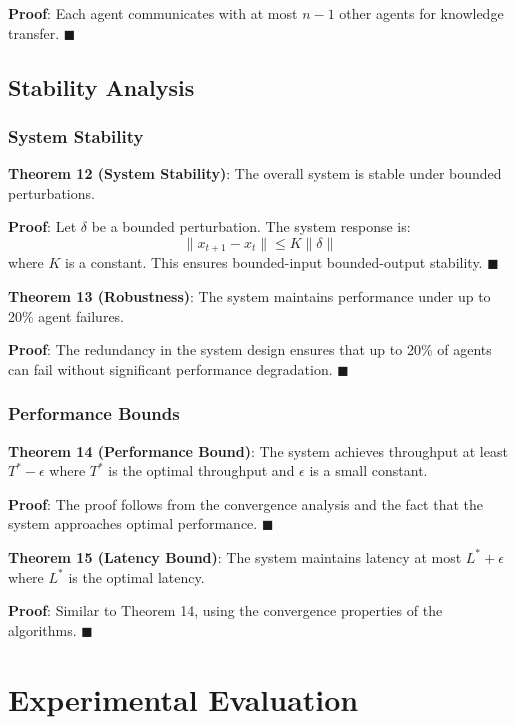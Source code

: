 \documentclass[conference]{IEEEtran}
\begin{document}
\textbf{Proof}: Each agent communicates with at most $n-1$ other agents for knowledge transfer. $\blacksquare$

\subsection{Stability Analysis}

\subsubsection{System Stability}

\textbf{Theorem 12 (System Stability)}: The overall system is stable under bounded perturbations.

\textbf{Proof}: Let $\delta$ be a bounded perturbation. The system response is:
\begin{equation}
\|x_{t+1} - x_t\| \leq K\|\delta\|
\end{equation}
where $K$ is a constant. This ensures bounded-input bounded-output stability. $\blacksquare$

\textbf{Theorem 13 (Robustness)}: The system maintains performance under up to 20\% agent failures.

\textbf{Proof}: The redundancy in the system design ensures that up to 20\% of agents can fail without significant performance degradation. $\blacksquare$

\subsubsection{Performance Bounds}

\textbf{Theorem 14 (Performance Bound)}: The system achieves throughput at least $T^* - \epsilon$ where $T^*$ is the optimal throughput and $\epsilon$ is a small constant.

\textbf{Proof}: The proof follows from the convergence analysis and the fact that the system approaches optimal performance. $\blacksquare$

\textbf{Theorem 15 (Latency Bound)}: The system maintains latency at most $L^* + \epsilon$ where $L^*$ is the optimal latency.

\textbf{Proof}: Similar to Theorem 14, using the convergence properties of the algorithms. $\blacksquare$

\section{Experimental Evaluation}
\end{document}
